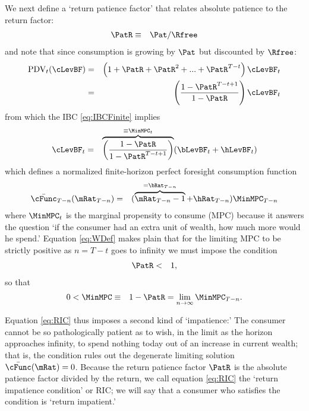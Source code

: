 \documentclass[titlepage]{\econtex}\providecommand{\texname}{BufferStockTheory}%
\begin{document}
We next define a `return patience factor' that relates absolute patience to the return factor:
\begin{eqnarray}
 \PatR & \equiv & {\Pat}/\Rfree \label{eq:PatR}
\end{eqnarray}
and note that since consumption is growing by $\Pat$ but discounted by $\Rfree$:
\begin{eqnarray*}
  \text{PDV}_{t}(\cLevBF) & = & \left(1+\PatR+\PatR^{2}+...+ \PatR^{T-t}\right)\cLevBF_{t} \notag
\\ & = & \left(\frac{1-\PatR^{T-t+1}}{1-\PatR}\right)\cLevBF_{t}
\end{eqnarray*}
from which the IBC \eqref{eq:IBCFinite} implies
\begin{eqnarray}
  \cLevBF_{t} & = & \overbrace{\left(\frac{1-\PatR}{1-\PatR^{T-t+1}}\right)}^{\equiv \MinMPC_{t}}
(\bLevBF_{t}+\hLevBF_{t}) \label{eq:vecMuDef} \label{eq:WDef}
\end{eqnarray}
which defines a normalized finite-horizon perfect foresight consumption function
\begin{eqnarray}
  \bar{\cFunc}_{T-n}(\mRat_{T-n}) & = & (\overbrace{\mRat_{T-n}-1}^{=\bRat_{T-n}}+\hRat_{T-n})\MinMPC_{T-n}
\end{eqnarray}
where $\MinMPC_{t}$ is the marginal propensity to consume (MPC) because it answers the
question `if the consumer had an extra unit of wealth, how much more would he spend.'
Equation \eqref{eq:WDef} makes plain that for the limiting
MPC to be strictly positive as $n=T-t$ goes to infinity we must impose the
condition
\begin{eqnarray}
\PatR & < & 1 \label{eq:PDVCFinite} \label{eq:RIC},
\end{eqnarray}
so that
\begin{eqnarray}
   0 <  \MinMPC & \equiv &  1-\PatR = \lim_{n \rightarrow \infty} \MinMPC_{T-n} \label{eq:MinMPCDef}
.
\end{eqnarray}

Equation \eqref{eq:RIC} thus imposes a second kind of `impatience:' The consumer cannot be so pathologically patient as to wish, in the limit as the horizon approaches infinity, to spend nothing today out of an increase in current wealth; that is, the condition rules out the degenerate limiting solution $\bar{\cFunc}(\mRat)=0$.  Because the return patience factor $\PatR$ is the absolute patience factor divided by the return, we call equation \eqref{eq:RIC} the `return impatience condition' or RIC; we will say that a consumer who satisfies the condition is `return impatient.'
\end{document}
